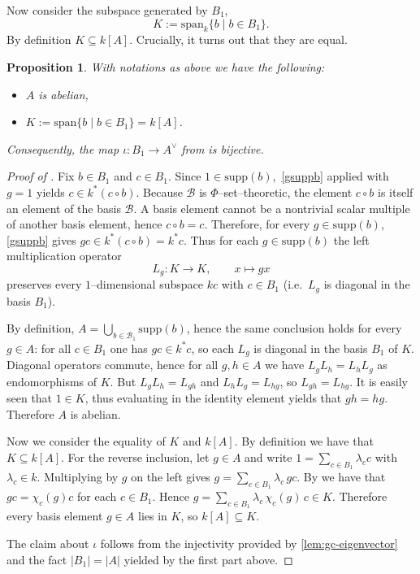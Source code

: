 \documentclass[a4paper,10pt]{amsart}
\newtheorem{proposition}[lemma]{Proposition}
\theoremstyle{definition}
\theoremstyle{remark}
\newcommand{\Supp}{\mathrm{supp}}
\newcommand{\Span}{\mathrm{span}}
\newcommand\mc{\mathcal}
\begin{document}
Now consider the subspace generated by $B_1$,
$$K:=\Span_{k}\{ b \mid b \in B_1\}.$$
By definition $K \subseteq k[A]$. Crucially, it turns out that they are equal.

\begin{proposition}\label{lem:A-abelian}
With notations as above we have the following:
\begin{itemize}
    \item $A$ is abelian,
    \item $K := \Span \{ b \mid b\in B_1\} = k[A]$.
\end{itemize}
Consequently, the map $\iota:B_1\to A^\vee$ from  is bijective.
\end{proposition}

\begin{proof}[Proof of ]
Fix $b\in B_1$ and $c\in B_1$.
Since $1\in\Supp(b)$, \,\eqref{gsuppb} applied with $g=1$ yields $c \in k^\ast (c\circ b).$ Because $\mc B$ is $\Phi$--set--theoretic, the element $c\circ b$ is itself an element of the basis $\mc B$.
A basis element cannot be a nontrivial scalar multiple of another basis element, hence $c\circ b=c$.
Therefore, for every $g\in\Supp(b)$, \,\eqref{gsuppb} gives $gc \in k^\ast (c\circ b)=k^\ast c.$ Thus for each $g\in\Supp(b)$ the left multiplication operator
\[
L_g:K\to K,\qquad x\mapsto gx
\]
preserves every $1$--dimensional subspace $kc$ with $c\in B_1$ (i.e.\ $L_g$ is diagonal in the basis $B_1$).

By definition, $A=\bigcup_{b\in\mc B_1}\Supp(b)$, hence the same conclusion holds for every $g\in A$:
for all $c\in B_1$ one has $gc\in k^\ast c$, so each $L_g$ is diagonal in the basis $B_1$ of $K$.
Diagonal operators commute, hence for all $g,h\in A$ we have $L_gL_h=L_hL_g$ as endomorphisms of $K$.
But $L_gL_h=L_{gh}$ and $L_hL_g=L_{hg}$, so $L_{gh}=L_{hg}$. It is easily seen that $1 \in K$, thus evaluating in the identity element yields that $gh = hg.$ Therefore $A$ is abelian.\medskip

Now we consider the equality of $K$ and $k[A]$. By definition we have that $K \subseteq k[A]$.  For the reverse inclusion, let $g\in A$ and write $1=\sum_{c\in B_1}\lambda_c c$ with $\lambda_c\in k$.
Multiplying by $g$ on the left gives
\(
g=\sum_{c\in B_1}\lambda_c\,g c.
\)
By  we have that $gc=\chi_c(g)c$ for each $c\in B_1$. Hence $ g=\sum_{c\in  B_1}\lambda_c\,\chi_c(g)\,c\in K.$ Therefore every basis element $g\in A$ lies in $K$, so $k[A]\subseteq K$.

The claim about $\iota$ follows from the injectivity provided by \cref{lem:gc-eigenvector} and the fact $|B_1|=|A|$ yielded by the first part above.
\end{proof}
\end{document}
